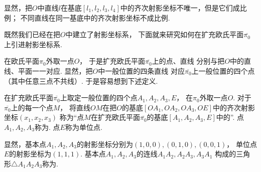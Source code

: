 显然，把\(O\)中直线\(l\)在基底\([l_1,l_2,l_3,l_4]\)中的齐次射影坐标不唯一，但是它们成比例；
不同直线在同一基底中的齐次射影坐标不成比例.

既然我们已经在把\(O\)中建立了射影坐标系，
下面就来研究如何在扩充欧氏平面\(\overline{\pi_0}\)上引进射影坐标系.

在欧氏平面\(\pi_0\)外取一点\(O\)，
于是扩充欧氏平面\(\overline{\pi_0}\)上的点、直线
分别与把\(O\)中的直线、平面一一对应.
显然，把\(O\)中一般位置的四条直线
对应\(\overline{\pi_0}\)上一般位置的四个点（其中任意三点不共线）.
于是容易想到下述定义.
\begin{definition}\label{definition:解析几何.射影坐标及其变换.扩充欧氏平面的射影坐标系}
在扩充欧氏平面\(\overline{\pi_0}\)上取定一般位置的四个点\(A_1,A_2,A_3,E\)，
在\(\pi_0\)外取一点\(O\).
对于\(\overline{\pi_0}\)上的每一个点\(M\)，
将直线\(OM\)在把\(O\)的基底\([OA_1,OA_2,OA_3,OE]\)中的齐次射影坐标\((x_1,x_2,x_3)\)
称为“点\(M\)在扩充欧氏平面\(\overline{\pi_0}\)的基底\([A_1,A_2,A_3,E]\)中的”.
点\(A_1,A_2,A_3\)称为.
点\(E\)称为单位点.
\end{definition}

显然，基本点\(A_1,A_2,A_3\)的射影坐标分别为\((1,0,0),(0,1,0),(0,0,1)\)，
单位点\(E\)的射影坐标为\((1,1,1)\).
基本点\(A_1,A_2,A_3\)的连线\(A_1A_2,A_2A_3,A_3A_1\)
构成的三角形\(\triangle A_1A_2A_3\)称为.

